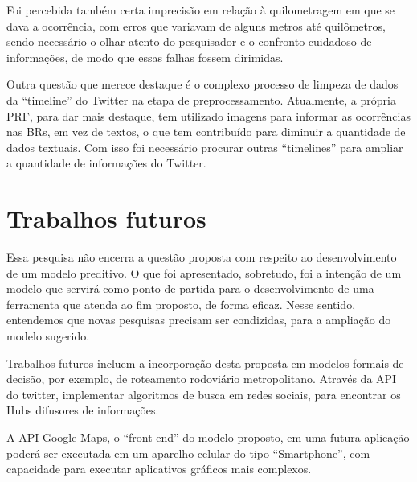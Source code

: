 Foi percebida também certa imprecisão em relação à quilometragem em que se dava a ocorrência, com erros que variavam de alguns metros até quilômetros, sendo necessário o olhar atento do pesquisador e o confronto cuidadoso de informações, de modo que essas falhas fossem dirimidas.

Outra questão que merece destaque é o complexo processo de limpeza de dados da ``timeline'' do Twitter na etapa de preprocessamento. Atualmente, a própria PRF, para dar mais destaque, tem utilizado imagens para informar as ocorrências nas BRs, em vez de textos, o que tem contribuído para diminuir a quantidade de dados textuais. Com isso foi necessário procurar outras ``timelines'' para ampliar a quantidade de informações do Twitter.

\pagebreak

\section{Trabalhos futuros}

Essa pesquisa não encerra a questão proposta com respeito ao desenvolvimento de um modelo preditivo. O que foi apresentado, sobretudo, foi a intenção de um modelo que servirá como ponto de partida para o desenvolvimento de uma ferramenta que atenda ao fim proposto, de forma eficaz. Nesse sentido, entendemos que novas pesquisas precisam ser condizidas, para a ampliação do modelo sugerido. 

Trabalhos futuros incluem a incorporação desta proposta em modelos formais de decisão, por exemplo, de roteamento
rodoviário metropolitano. Através da API do twitter, implementar algoritmos de busca em redes sociais, para encontrar os Hubs difusores de informações.

A API Google Maps, o ``front-end'' do modelo proposto, em uma futura aplicação poderá ser executada em um aparelho 
celular do tipo ``Smartphone'', com capacidade para executar aplicativos gráficos mais complexos.

